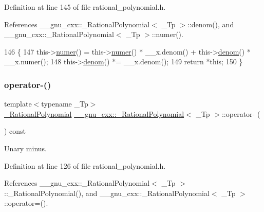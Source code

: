 Definition at line 145 of file rational\+\_\+polynomial.\+h.



References \+\_\+\+\_\+gnu\+\_\+cxx\+::\+\_\+\+Rational\+Polynomial$<$ \+\_\+\+Tp $>$\+::denom(), and \+\_\+\+\_\+gnu\+\_\+cxx\+::\+\_\+\+Rational\+Polynomial$<$ \+\_\+\+Tp $>$\+::numer().


\begin{DoxyCode}
146       \{
147         this->\hyperlink{class____gnu__cxx_1_1__RationalPolynomial_aa42ac2f6c2368cae05ba3a3cebf0fa24}{numer}() = this->\hyperlink{class____gnu__cxx_1_1__RationalPolynomial_aa42ac2f6c2368cae05ba3a3cebf0fa24}{numer}() * \_\_x.denom() + this->\hyperlink{class____gnu__cxx_1_1__RationalPolynomial_a05e84913ccfddcf6fcbfe623cb56c937}{denom}() * \_\_x.numer();
148         this->\hyperlink{class____gnu__cxx_1_1__RationalPolynomial_a05e84913ccfddcf6fcbfe623cb56c937}{denom}() *= \_\_x.denom();
149         \textcolor{keywordflow}{return} *\textcolor{keyword}{this};
150       \}
\end{DoxyCode}
\mbox{\label{class____gnu__cxx_1_1__RationalPolynomial_a21c445f37dbceb2832ab1eebf5d2d965}} 
\subsubsection{\texorpdfstring{operator-\/()}{operator-()}}
{\footnotesize\ttfamily template$<$typename \+\_\+\+Tp$>$ \\
\hyperlink{class____gnu__cxx_1_1__RationalPolynomial}{\+\_\+\+Rational\+Polynomial} \hyperlink{class____gnu__cxx_1_1__RationalPolynomial}{\+\_\+\+\_\+gnu\+\_\+cxx\+::\+\_\+\+Rational\+Polynomial}$<$ \+\_\+\+Tp $>$\+::operator-\/ (\begin{DoxyParamCaption}{ }\end{DoxyParamCaption}) const\hspace{0.3cm}{\ttfamily [inline]}}

Unary minus. 

Definition at line 126 of file rational\+\_\+polynomial.\+h.



References \+\_\+\+\_\+gnu\+\_\+cxx\+::\+\_\+\+Rational\+Polynomial$<$ \+\_\+\+Tp $>$\+::\+\_\+\+Rational\+Polynomial(), and \+\_\+\+\_\+gnu\+\_\+cxx\+::\+\_\+\+Rational\+Polynomial$<$ \+\_\+\+Tp $>$\+::operator=().


